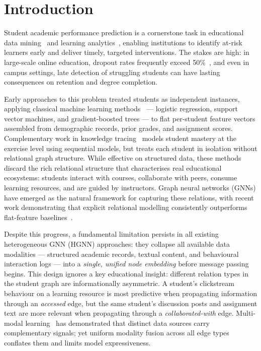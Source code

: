 \documentclass[sigconf]{acmart}
\begin{document}
\maketitle

\section{Introduction}
\label{sec:intro}
Student academic performance prediction is a cornerstone
task in educational data mining~\citep{romero2010educational}
and learning analytics~\citep{siemens2013learning},
enabling institutions to identify at-risk learners early
and deliver timely, targeted interventions. The stakes
are high: in large-scale online education, dropout rates
frequently exceed 50\%~\citep{huang2024temporal}, and
even in campus settings, late detection of struggling
students can have lasting consequences on retention and
degree completion.

Early approaches to this problem treated students as
independent instances, applying classical machine
learning methods~\citep{kotsiantis2012use,
delen2011predicting} --- logistic regression, support
vector machines, and gradient-boosted trees --- to flat
per-student feature vectors assembled from demographic
records, prior grades, and assignment scores.
Complementary work in knowledge
tracing~\citep{piech2015deep, ghosh2020context,
pandey2019self} models student mastery at the
exercise level using sequential models, but treats
each student in isolation without relational graph
structure. While effective on structured data,
these methods discard the
rich relational structure that characterises real
educational ecosystems: students interact with courses,
collaborate with peers, consume learning resources, and
are guided by instructors. Graph neural networks (GNNs)
have emerged as the natural framework for capturing
these relations, with recent work demonstrating that
explicit relational modelling consistently outperforms
flat-feature baselines~\citep{li2022studygnn,
huang2024dual, yang2024hypergraph}.

Despite this progress, a fundamental limitation persists
in all existing heterogeneous GNN (HGNN) approaches: they
collapse all available data modalities --- structured
academic records, textual content, and behavioural
interaction logs --- into a \emph{single, unified node
embedding} before message passing begins. This design
ignores a key educational insight: different relation
types in the student graph are informationally
asymmetric. A student's clickstream behaviour on a
learning resource is most predictive when propagating
information through an \textit{accessed} edge, but the
same student's discussion posts and assignment text are
more relevant when propagating through a
\textit{collaborated-with} edge. Multi-modal
learning~\citep{baltrusaitis2019multimodal} has
demonstrated that distinct data sources carry
complementary signals; yet uniform modality fusion
across all edge types conflates them
and limits model expressiveness.
\end{document}
